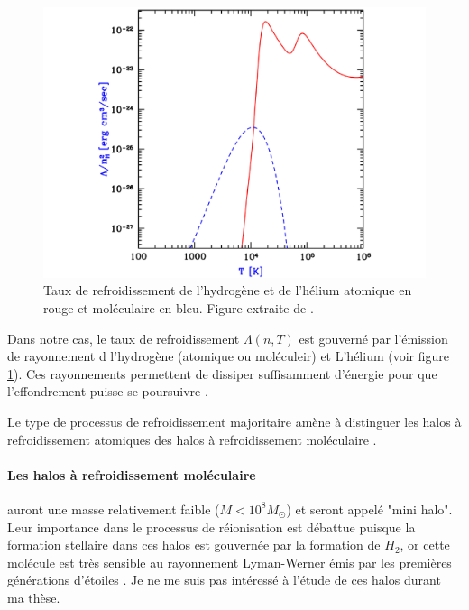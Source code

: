 \begin{figure}
        \includegraphics[width=.95\linewidth]{img/01/fonction_refroidissement.pdf} 
        \caption[Fonction de refroidissement]{Taux de refroidissement de l'hydrogène et de l'hélium atomique en rouge et moléculaire en bleu. 
        Figure extraite de \cite{2016PhR...645....1B}.
 		\label{fig:refroidissement}}
\end{figure}

Dans notre cas, le taux de refroidissement $\Lambda(n,T)$ est gouverné par l'émission de rayonnement d l'hydrogène (atomique ou moléculeir) et L’hélium (voir figure \ref{fig:refroidissement}).
Ces rayonnements permettent de dissiper suffisamment d'énergie pour que l'effondrement puisse se poursuivre \citep{2001PhR...349..125B}.

Le type de processus de refroidissement majoritaire amène à distinguer les halos à refroidissement atomiques des halos à refroidissement moléculaire \citep{2002Sci...295...93A}.

\paragraph{Les halos à refroidissement moléculaire} auront une masse relativement faible ($M < 10^8 M_\odot$) et seront appelé "mini halo".
Leur importance dans le processus de réionisation est débattue \citep{2012ApJ...756L..16A} puisque la formation stellaire dans ces halos est gouvernée par la formation de $H_2$, or cette molécule est très sensible au rayonnement Lyman-Werner émis par les premières générations d'étoiles \citep{2002ApJ...575...49R}.
Je ne me suis pas intéressé à l'étude de ces halos durant ma thèse.

